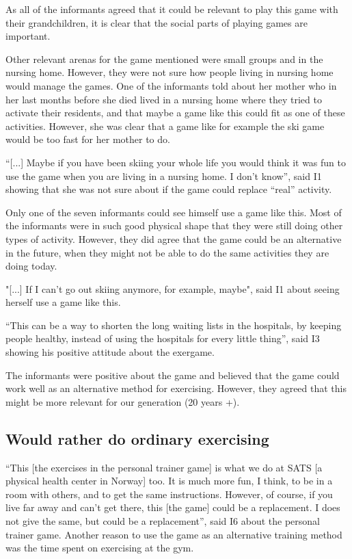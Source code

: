 As all of the informants agreed that it could be relevant to play this game with their grandchildren, it is clear that the social parts of playing games are important. 

Other relevant arenas for the game mentioned were small groups and in the nursing home. However, they were not sure how people living in nursing home would manage the games. One of the informants told about her mother who in her last months before she died lived in a nursing home where they tried to activate their residents, and that maybe a game like this could fit as one of these activities. However, she was clear that a  game like for example the ski game would be too fast for her mother to do. 

“[...] Maybe if you have been skiing your whole life you would think it was fun to use the game when you are living in a nursing home. I don't know”, said I1 showing that she was not sure about if the game could replace “real” activity. 

Only one of the seven informants could see himself use a game like this. Most of the informants were in such good physical shape that they were still doing other types of activity. However, they did agree that the game could be an alternative in the future, when they might not be able to do the same activities they are doing today. 

"[...] If I can't go out skiing anymore, for example, maybe", said I1 about seeing herself use a game like this. 

“This can be a way to shorten the long waiting lists in the hospitals, by keeping people healthy, instead of using the hospitals for every little thing”, said I3 showing his positive attitude about the exergame. 

The informants were positive about the game and believed that the game could work well as an alternative method for exercising. However, they agreed that this might be more relevant for our generation (20 years +). 

\subsection{Would rather do ordinary exercising}
“This [the exercises in the personal trainer game] is what we do at SATS [a physical health center in Norway] too. It is much more fun, I think, to be in a room with others, and to get the same instructions. However, of course, if you live far away and can't get there, this [the game] could be a replacement. I does not give the same, but could be a replacement”, said I6 about the personal trainer game. Another reason to use the game as an alternative training method was the time spent on exercising at the gym.

